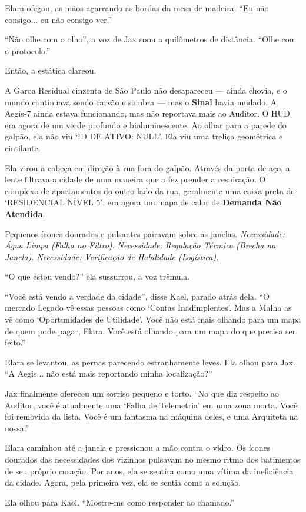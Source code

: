 Elara ofegou, as mãos agarrando as bordas da mesa de madeira. ``Eu não consigo... eu não consigo ver.''

``Não olhe com o olho'', a voz de Jax soou a quilômetros de distância. ``Olhe com o protocolo.''

Então, a estática clareou. 

A Garoa Residual cinzenta de São Paulo não desapareceu --- ainda chovia, e o mundo continuava sendo carvão e sombra --- mas o \textbf{Sinal} havia mudado. A Aegis-7 ainda estava funcionando, mas não reportava mais ao Auditor. O HUD era agora de um verde profundo e bioluminescente. Ao olhar para a parede do galpão, ela não viu `ID DE ATIVO: NULL'. Ela viu uma treliça geométrica e cintilante.


Ela virou a cabeça em direção à rua fora do galpão. Através da porta de aço, a lente filtrava a cidade de uma maneira que a fez prender a respiração. O complexo de apartamentos do outro lado da rua, geralmente uma caixa preta de `RESIDENCIAL NÍVEL 5', era agora um mapa de calor de \textbf{Demanda Não Atendida}.

Pequenos ícones dourados e pulsantes pairavam sobre as janelas. 
\textit{Necessidade: Água Limpa (Falha no Filtro).}
\textit{Necessidade: Regulação Térmica (Brecha na Janela).}
\textit{Necessidade: Verificação de Habilidade (Logística).}

``O que estou vendo?'' ela sussurrou, a voz trêmula.

``Você está vendo a verdade da cidade'', disse Kael, parado atrás dela. ``O mercado Legado vê essas pessoas como `Contas Inadimplentes'. Mas a Malha as vê como `Oportunidades de Utilidade'. Você não está mais olhando para um mapa de quem pode pagar, Elara. Você está olhando para um mapa do que precisa ser feito.''

Elara se levantou, as pernas parecendo estranhamente leves. Ela olhou para Jax. ``A Aegis... não está mais reportando minha localização?''

Jax finalmente ofereceu um sorriso pequeno e torto. ``No que diz respeito ao Auditor, você é atualmente uma `Falha de Telemetria' em uma zona morta. Você foi removida da lista. Você é um fantasma na máquina deles, e uma Arquiteta na nossa.''

Elara caminhou até a janela e pressionou a mão contra o vidro. Os ícones dourados das necessidades dos vizinhos pulsavam no mesmo ritmo dos batimentos de seu próprio coração. Por anos, ela se sentira como uma vítima da ineficiência da cidade. Agora, pela primeira vez, ela se sentia como a solução.

Ela olhou para Kael. ``Mostre-me como responder ao chamado.''

